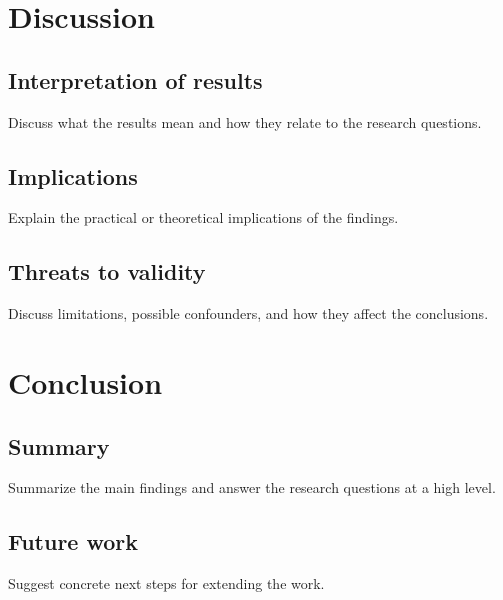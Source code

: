 \documentclass[PhD]{uclathes}
\begin{document}
\chapter{Discussion}

\section{Interpretation of results}
Discuss what the results mean and how they relate to the research questions.

\section{Implications}
Explain the practical or theoretical implications of the findings.

\section{Threats to validity}
Discuss limitations, possible confounders, and how they affect the conclusions.

\chapter{Conclusion}

\section{Summary}
Summarize the main findings and answer the research questions at a high level.

\section{Future work}
Suggest concrete next steps for extending the work.


% 
% 
\end{document}
